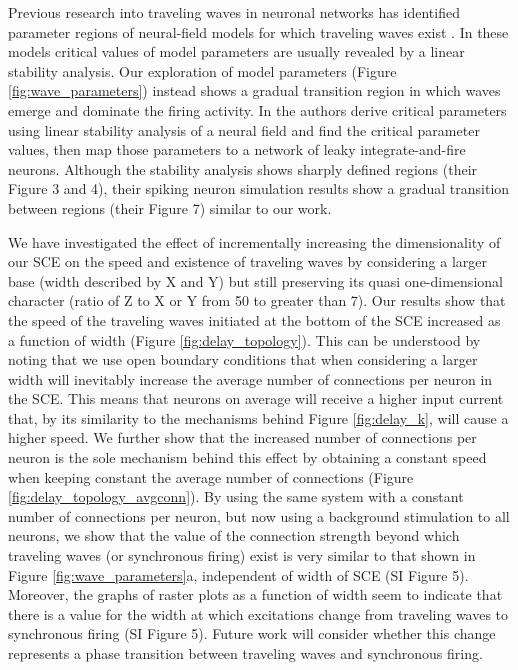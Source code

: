 \documentclass[12pt]{article}
\begin{document}
Previous research into traveling waves in neuronal networks has identified parameter regions of neural-field models for which traveling waves exist \color{red}\parencite{Wilson1973}\parencite{Ermentrout1979}\color{black}. 
\color{red}
In these models critical values of model parameters are usually revealed by a linear stability analysis.
\color{black}
Our exploration of model parameters (Figure \ref{fig:wave_parameters}) instead shows a gradual transition region in which waves emerge and dominate the firing activity.
\color{red}
In \parencite{Senk2020} the authors derive critical parameters using linear stability analysis of a neural field and find the critical parameter values, then map those parameters to a network of leaky integrate-and-fire neurons.
Although the stability analysis shows sharply defined regions (their Figure 3 and 4), their spiking neuron simulation results show a gradual transition between regions (their Figure 7) similar to our work.

We have investigated the effect of incrementally increasing the dimensionality of our SCE on the speed and existence of traveling waves by considering a larger base (width described by X and Y) but still preserving its quasi one-dimensional character (ratio of Z to X or Y from 50 to greater than 7).
Our results show that the speed of the traveling waves initiated at the bottom of the SCE increased as a function of width (Figure \ref{fig:delay_topology}).
This can be understood by noting that we use open boundary conditions that when considering a larger width will inevitably increase the average number of connections per neuron in the SCE.
This means that neurons on average will receive a higher input current that, by its similarity to the mechanisms behind Figure \ref{fig:delay_k}, will cause a higher speed. 
We further show that the increased number of connections per neuron is the sole mechanism behind this effect by obtaining a constant speed when keeping constant the average number of connections (Figure \ref{fig:delay_topology_avgconn}).
By using the same system with a constant number of connections per neuron, but now using a background stimulation to all neurons, we show that the value of the connection strength beyond which traveling waves (or synchronous firing) exist is very similar to that shown in Figure \ref{fig:wave_parameters}a, independent of width of SCE (SI Figure 5).
Moreover, the graphs of raster plots as a function of width seem to indicate that there is a value for the width at which excitations change from traveling waves to synchronous firing (SI Figure 5).
Future work will consider whether this change represents a phase transition between traveling waves and synchronous firing.
\color{black}
\end{document}
